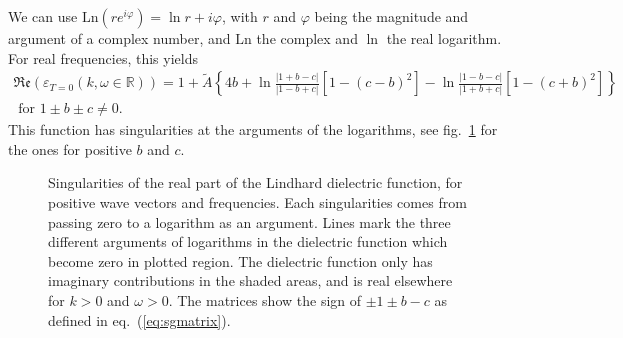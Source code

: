 \documentclass[physics,phd,nolot,nolof]{uccthesis}%
\newcommand{\Ln}{\text{Ln}}
\begin{document}
{We can use $\Ln(r e^{i\varphi})=\ln r +i\varphi$, 
with $r$ and $\varphi$ being the magnitude and argument of a complex number,
and $\Ln$ the complex and $\ln$ the real logarithm.
For real frequencies, this yields
\begin{equation}
  \begin{split}
  \mathfrak{Re}( \varepsilon_{T=0}(k,\omega\in\mathbb{R}))=
  1+\tilde{A}\left\lbrace 4b
  +\ln\frac{|1+b-c|}{|1-b+c|}\left[ 1- (c-b)^2\right]
  -\ln\frac{|1-b-c|}{|1+b+c|}\left[ 1- (c+b)^2\right]
  \right\rbrace
  \\
  \text{ for } 1\pm b\pm c \neq 0.
  \label{eq:re_epslindhard_realw}
\end{split}
\end{equation}
This function has singularities at the arguments of the logarithms, see fig.~\ref{fig:lindhardsingularities} for the ones for positive $b$ and $c$.
\begin{figure}[ht]
  \begin{center}
    
  \end{center}
  \caption{Singularities of the real part of the Lindhard dielectric function, for positive wave vectors and frequencies. 
  Each singularities comes from passing zero to  a logarithm as an argument. 
  Lines mark the three different arguments of logarithms in the dielectric function which become zero in plotted region.\newline
  The dielectric function only has imaginary contributions in the shaded areas, and is real elsewhere for $k>0$ and $\omega>0$.
  The matrices show the sign of $\pm1\pm b-c$ as defined in eq.~(\ref{eq:sgmatrix}).}
  \label{fig:lindhardsingularities}
\end{figure}

}
\end{document}
